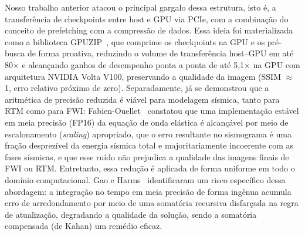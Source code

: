 \documentclass[12pt,a4paper]{article}
\begin{document}
Nosso trabalho anterior atacou o principal gargalo dessa estrutura, isto é, a
transferência de checkpoints entre host e GPU via PCIe, com a combinação do conceito de prefetching com a compressão de dados.
Essa ideia foi materializada como a biblioteca GPUZIP~\cite{maltempi2025checkpointing,gpuzip}, que comprime os checkpoints
na GPU e os pré-busca de forma proativa, reduzindo o volume de transferência
host--GPU em até 80$\times$ e alcançando ganhos de desempenho ponta a ponta
de até 5,1$\times$ na GPU com arquitetura NVIDIA Volta V100, preservando a qualidade da imagem (SSIM
$\approx$ 1, erro relativo próximo de zero). Separadamente, já se demonstrou
que a aritmética de precisão reduzida é viável para modelagem sísmica, tanto
para RTM como para FWI: Fabien-Ouellet~\cite{fabienouellet2020half} constatou que uma
implementação estável em meia precisão (FP16) da equação de onda elástica é
alcançável por meio de escalonamento (\emph{scaling}) apropriado, que o erro
resultante no sismograma é uma fração desprezível da energia sísmica total e
majoritariamente incoerente com as fases sísmicas, e que esse ruído não
prejudica a qualidade das imagens finais de FWI ou RTM. Entretanto, essa redução é
aplicada de forma uniforme em todo o domínio computacional. Gao e
Harms~\cite{gao2023half} identificaram um risco específico dessa abordagem:
a integração no tempo em meia precisão de forma ingênua acumula erro de
arredondamento por meio de uma somatória recursiva disfarçada na regra de
atualização, degradando a qualidade da solução, sendo a somatória compensada
(de Kahan) um remédio eficaz.
\end{document}
